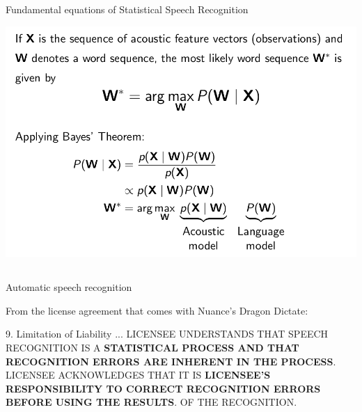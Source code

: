 \documentclass[9pt,xcolor=pdftex,dvipsnames,table]{beamer}
\begin{document}
\subsection{}
\begin{frame}{Fundamental equations of Statistical Speech Recognition}


	\begin{center}
    \includegraphics[scale=.33]{ASR-equations}
	\end{center}

\end{frame}

\subsection{}
\begin{frame}{Automatic speech recognition}

{\Large From the license agreement that comes with Nuance's Dragon Dictate:}
\vspace{.25cm}

\begin{alertblock}{9. Limitation of Liability}
...
LICENSEE UNDERSTANDS THAT SPEECH RECOGNITION IS A \textbf{STATISTICAL PROCESS AND THAT RECOGNITION ERRORS ARE INHERENT IN THE PROCESS}. LICENSEE ACKNOWLEDGES THAT IT IS \textbf{LICENSEE'S RESPONSIBILITY TO CORRECT RECOGNITION ERRORS BEFORE USING THE RESULTS}.
OF THE RECOGNITION.
\end{alertblock}

\end{frame}
\end{document}
